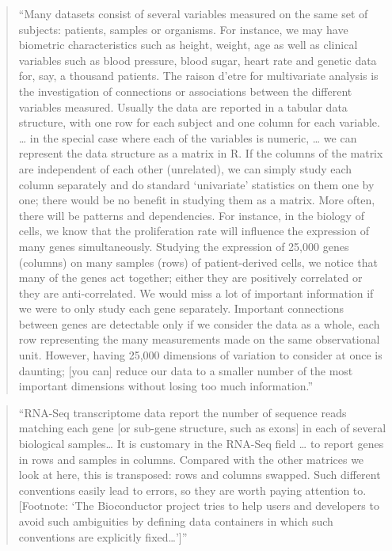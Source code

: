 \documentclass[]{tufte-book}
\begin{document}
\begin{quote}
``Many datasets consist of several variables measured on the same set of
subjects: patients, samples or organisms. For instance, we may have biometric
characteristics such as height, weight, age as well as clinical variables such
as blood pressure, blood sugar, heart rate and genetic data for, say, a
thousand patients. The raison d'etre for multivariate analysis is the
investigation of connections or associations between the different variables
measured. Usually the data are reported in a tabular data structure, with one
row for each subject and one column for each variable. \ldots{} in the special
case where each of the variables is numeric, \ldots{} we can represent the data
structure as a matrix in R. If the columns of the matrix are independent of
each other (unrelated), we can simply study each column separately and do
standard `univariate' statistics on them one by one; there would be no
benefit in studying them as a matrix. More often, there will be patterns and
dependencies. For instance, in the biology of cells, we know that the
proliferation rate will influence the expression of many genes simultaneously.
Studying the expression of 25,000 genes (columns) on many samples (rows) of
patient-derived cells, we notice that many of the genes act together; either
they are positively correlated or they are anti-correlated. We would miss a
lot of important information if we were to only study each gene separately.
Important connections between genes are detectable only if we consider the
data as a whole, each row representing the many measurements made on the
same observational unit. However, having 25,000 dimensions of variation to
consider at once is daunting; {[}you can{]} reduce our data to a smaller number
of the most important dimensions without losing too much information.'' \citep{holmes2018modern}
\end{quote}

\begin{quote}
``RNA-Seq transcriptome data report the number of sequence reads matching
each gene {[}or sub-gene structure, such as exons{]} in each of several biological
samples\ldots{} It is customary in the RNA-Seq field \ldots{} to report genes in rows and
samples in columns. Compared with the other matrices we look at here, this
is transposed: rows and columns swapped. Such different conventions easily
lead to errors, so they are worth paying attention to. {[}Footnote: `The
Bioconductor project tries to help users and developers to avoid such
ambiguities by defining data containers in which such conventions are
explicitly fixed\ldots{}'{]}'' \citep{holmes2018modern}
\end{quote}
\end{document}
